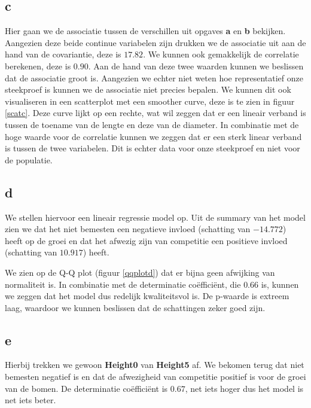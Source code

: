 \documentclass[11pt, a4paper]{article}
\begin{document}
\subsection*{c}
Hier gaan we de associatie tussen de verschillen uit opgaves \textbf{a} en \textbf{b} bekijken. Aangezien deze beide continue variabelen zijn drukken we de associatie uit aan de hand van de covariantie, deze is $17.82$. We kunnen ook gemakkelijk de correlatie berekenen, deze is $0.90$. Aan de hand van deze twee waarden kunnen we beslissen dat de associatie groot is. Aangezien we echter niet weten hoe representatief onze steekproef is kunnen we de associatie niet precies bepalen. We kunnen dit ook visualiseren in een scatterplot met een smoother curve, deze is te zien in figuur \ref{scatc}. Deze curve lijkt op een rechte, wat wil zeggen dat er een lineair verband is tussen de toename van de lengte en deze van de diameter. In combinatie met de hoge waarde voor de correlatie kunnen we zeggen dat er een sterk linear verband is tussen de twee variabelen. Dit is echter data voor onze steekproef en niet voor de populatie.

\subsection*{d}
We stellen hiervoor een lineair regressie model op. Uit de summary van het model zien we dat het niet bemesten een negatieve invloed (schatting van $-14.772$) heeft op de groei en dat het afwezig zijn van competitie een positieve invloed (schatting van $10.917$) heeft. 

\begin{figure}
\end{figure}
We zien op de Q-Q plot (figuur \ref{qqplotd}) dat er bijna geen afwijking van normaliteit is. In combinatie met de determinatie co\"effici\"ent, die $0.66$ is, kunnen we zeggen dat het model dus redelijk kwaliteitsvol is. De p-waarde is extreem laag, waardoor we kunnen beslissen dat de schattingen zeker goed zijn. %

\subsection*{e}
Hierbij trekken we gewoon \textbf{Height0} van \textbf{Height5} af. We bekomen terug dat niet bemesten negatief is en dat de afwezigheid van competitie positief is voor de groei van de bomen. De determinatie co\"effici\"ent is $0.67$, net iets hoger dus het model is net iets beter.
\end{document}
